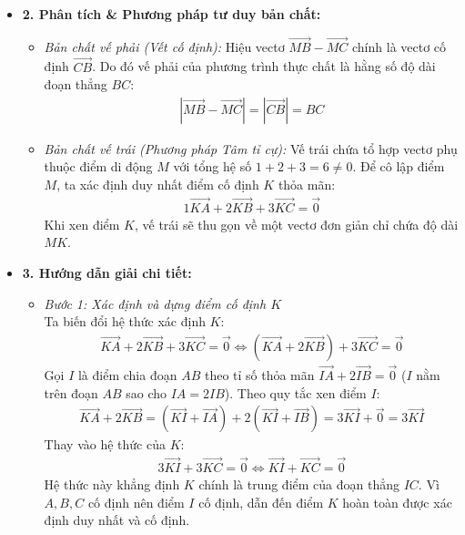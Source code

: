 \documentclass[12pt,a4paper]{article}
\begin{document}
\begin{itemize}
\begin{itemize}
        \item \textbf{2. Phân tích \& Phương pháp tư duy bản chất:}
        \begin{itemize}
            \item \textit{Bản chất vế phải (Vết cố định):} Hiệu vectơ $\vec{MB} - \vec{MC}$ chính là vectơ cố định $\vec{CB}$. Do đó vế phải của phương trình thực chất là hằng số độ dài đoạn thẳng $BC$:
            \begin{align*}
                \left|\vec{MB} - \vec{MC}\right| = \left|\vec{CB}\right| = BC
            \end{align*}
            \item \textit{Bản chất vế trái (Phương pháp Tâm tỉ cự):} Vế trái chứa tổ hợp vectơ phụ thuộc điểm di động $M$ với tổng hệ số $1 + 2 + 3 = 6 \neq 0$. Để cô lập điểm $M$, ta xác định duy nhất điểm cố định $K$ thỏa mãn:
            \begin{align*}
                1\vec{KA} + 2\vec{KB} + 3\vec{KC} = \vec{0}
            \end{align*}
            Khi xen điểm $K$, vế trái sẽ thu gọn về một vectơ đơn giản chỉ chứa độ dài $MK$.
        \end{itemize}

        \item \textbf{3. Hướng dẫn giải chi tiết:}
        \begin{itemize}
            \item \textit{Bước 1: Xác định và dựng điểm cố định $K$}\\
            Ta biến đổi hệ thức xác định $K$:
            \begin{align*}
                \vec{KA} + 2\vec{KB} + 3\vec{KC} = \vec{0} \Longleftrightarrow (\vec{KA} + 2\vec{KB}) + 3\vec{KC} = \vec{0}
            \end{align*}
            Gọi $I$ là điểm chia đoạn $AB$ theo tỉ số thỏa mãn $\vec{IA} + 2\vec{IB} = \vec{0}$ ($I$ nằm trên đoạn $AB$ sao cho $IA = 2IB$). Theo quy tắc xen điểm $I$:
            \begin{align*}
                \vec{KA} + 2\vec{KB} = (\vec{KI} + \vec{IA}) + 2(\vec{KI} + \vec{IB}) = 3\vec{KI} + \vec{0} = 3\vec{KI}
            \end{align*}
            Thay vào hệ thức của $K$:
            \begin{align*}
                3\vec{KI} + 3\vec{KC} = \vec{0} \Longleftrightarrow \vec{KI} + \vec{KC} = \vec{0}
            \end{align*}
            Hệ thức này khẳng định $K$ chính là trung điểm của đoạn thẳng $IC$. Vì $A, B, C$ cố định nên điểm $I$ cố định, dẫn đến điểm $K$ hoàn toàn được xác định duy nhất và cố định.


\end{itemize}
\end{itemize}
\end{itemize}
\end{document}
